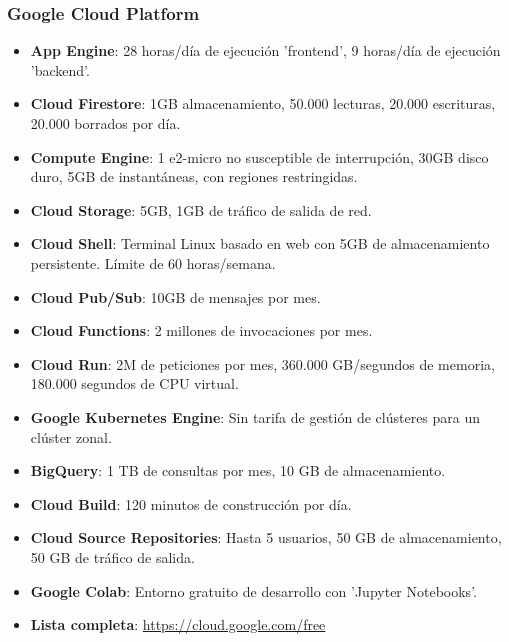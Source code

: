 \subsubsection*{Google Cloud Platform}
\begin{itemize}
	\item \textbf{App Engine}: 28 horas/día de ejecución 'frontend', 9 horas/día de ejecución 'backend'.
	\item \textbf{Cloud Firestore}: 1GB almacenamiento, 50.000 lecturas, 20.000 escrituras, 20.000 borrados por día.
	\item \textbf{Compute Engine}: 1 e2-micro no susceptible de interrupción, 30GB disco duro, 5GB de instantáneas, con regiones restringidas.
	\item \textbf{Cloud Storage}: 5GB, 1GB de tráfico de salida de red.
	\item \textbf{Cloud Shell}: Terminal Linux basado en web con 5GB de almacenamiento persistente. Límite de 60 horas/semana.
	\item \textbf{Cloud Pub/Sub}: 10GB de mensajes por mes.
	\item \textbf{Cloud Functions}: 2 millones de invocaciones por mes.
	\item \textbf{Cloud Run}: 2M de peticiones por mes, 360.000 GB/segundos de memoria, 180.000 segundos de CPU virtual.
	\item \textbf{Google Kubernetes Engine}: Sin tarifa de gestión de clústeres para un clúster zonal.
	\item \textbf{BigQuery}: 1 TB de consultas por mes, 10 GB de almacenamiento.
	\item \textbf{Cloud Build}: 120 minutos de construcción por día.
	\item \textbf{Cloud Source Repositories}: Hasta 5 usuarios, 50 GB de almacenamiento, 50 GB de tráfico de salida.
	\item \textbf{Google Colab}: Entorno gratuito de desarrollo con 'Jupyter Notebooks'.
	\item \textbf{Lista completa}: \url{https://cloud.google.com/free}
\end{itemize}

